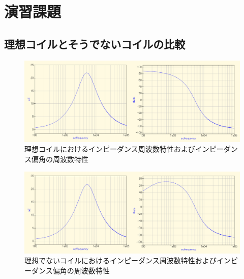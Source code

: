 
\section{演習課題}

\subsection{理想コイルとそうでないコイルの比較}

\begin{figure}[H]
    \begin{center}
        \includegraphics[scale=0.5]{ideal.pdf}
        \caption{理想コイルにおけるインピーダンス周波数特性およびインピーダンス偏角の周波数特性}
    \end{center}
\end{figure}

\begin{figure}[H]
    \begin{center}
        \includegraphics[scale=0.5]{not_ideal.pdf}
        \caption{理想でないコイルにおけるインピーダンス周波数特性およびインピーダンス偏角の周波数特性}
    \end{center}
\end{figure}